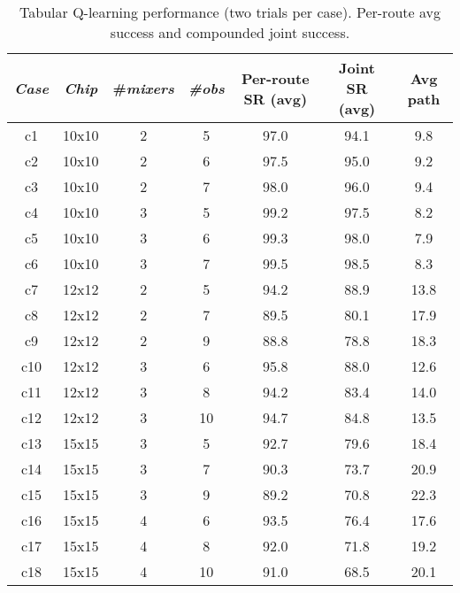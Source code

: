\begin{table}[t]
    \caption{Tabular Q-learning performance (two trials per case). Per-route avg success and compounded joint success.}
    \label{tab:results-ql}
    \centering
    \begin{tabular}{c|c|c|c|c|c|c}
    \hline
    \textit{Case} & \textit{Chip} & \#\textit{mixers} & \textit{\#obs} & Per-route SR (avg) & Joint SR (avg) & Avg path\\
    \hline
    c1 & 10x10 & 2 & 5 & 97.0 & 94.1 & 9.8\\
    c2 & 10x10 & 2 & 6 & 97.5 & 95.0 & 9.2\\
    c3 & 10x10 & 2 & 7 & 98.0 & 96.0 & 9.4\\
    c4 & 10x10 & 3 & 5 & 99.2 & 97.5 & 8.2\\
    c5 & 10x10 & 3 & 6 & 99.3 & 98.0 & 7.9\\
    c6 & 10x10 & 3 & 7 & 99.5 & 98.5 & 8.3\\
    c7 & 12x12 & 2 & 5 & 94.2 & 88.9 & 13.8\\
    c8 & 12x12 & 2 & 7 & 89.5 & 80.1 & 17.9\\
    c9 & 12x12 & 2 & 9 & 88.8 & 78.8 & 18.3\\
    c10 & 12x12 & 3 & 6 & 95.8 & 88.0 & 12.6\\
    c11 & 12x12 & 3 & 8 & 94.2 & 83.4 & 14.0\\
    c12 & 12x12 & 3 & 10 & 94.7 & 84.8 & 13.5\\
    c13 & 15x15 & 3 & 5 & 92.7 & 79.6 & 18.4\\
    c14 & 15x15 & 3 & 7 & 90.3 & 73.7 & 20.9\\
    c15 & 15x15 & 3 & 9 & 89.2 & 70.8 & 22.3\\
    c16 & 15x15 & 4 & 6 & 93.5 & 76.4 & 17.6\\
    c17 & 15x15 & 4 & 8 & 92.0 & 71.8 & 19.2\\
    c18 & 15x15 & 4 & 10 & 91.0 & 68.5 & 20.1\\
    \hline
    \end{tabular}
\end{table}
